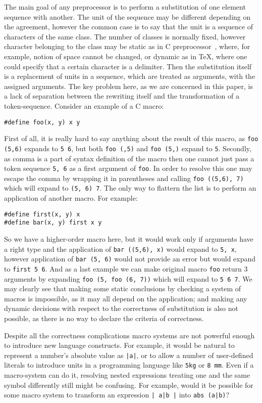 The main goal of any preprocessor is to perform a substitution of
one element sequence with another.  The unit of the sequence may 
be different depending on the agreement, however the common
case is to say that the unit is a sequence of characters of the
same class.  The number of classes is normally fixed, however 
character belonging to the class may be static as in 
C preprocessor~\cite{prepr},
where, for example, notion of space cannot be changed, or dynamic as
in \TeX, where one could specify that a certain character is a 
delimiter.  Then the substitution itself is a replacement of 
units in a sequence, which are treated as arguments, with the 
assigned arguments.  The key problem here, as we are concerned
in this paper, is a lack of separation between the rewriting itself
and the transformation of a token-sequence.  Consider an example of
a C macro:
\begin{verbatim}
#define foo(x, y) x y
\end{verbatim}
First of all, it is really hard to say anything about the result
of this macro, as \verb|foo (5,6)| expands to \verb|5 6|, but
both \verb|foo (,5)| and \verb|foo (5,)| expand to \verb|5|.
Secondly, as comma is a part of syntax definition of the macro
then one cannot just pass a token sequence \verb|5, 6| as a
first argument of \verb|foo|.  In order to resolve this one
may escape the comma by wrapping it in parentheses and calling
\verb|foo ((5,6), 7)| which will expand to \verb|(5, 6) 7|.
The only way to flattern the list is to perform an application
of another macro.  For example:
\begin{verbatim}
#define first(x, y) x
#define bar(x, y) first x y
\end{verbatim}
So we have a higher-order macro here, but it would work only if
arguments have a right type and the application of 
\verb|bar ((5,6), x)| would expand to \verb|5, x|, however
application of \verb|bar (5, 6)| would not provide an error
but would expand to \verb|first 5 6|.  And as a last example
we can make original macro \verb|foo| return 3 arguments
by expanding \verb|foo (5, foo (6, 7))| which will expand to
\verb|5 6 7|.  We may clearly see that making some static 
conclusions by checking a system of macros is impossible, as
it may all depend on the application; and making any dynamic
decisions with respect to the correctness of substitution is
also not possible, as there is no way to declare the criteria
of correctness.

Despite all the correctness complications macro systems are not powerful
enough to introduce new language constructs.  For example, it would be natural
to represent a number's absolute value as \verb/|a|/, or to allow a number of
user-defined literals to introduce units in a programming language like 
\verb/5kg/ or \verb|8 mm|.  Even if a macro-system can do it, resolving nested
expressions treating one and the same symbol differently still might be
confusing.  For example, would it be possible for some macro system to
transform an expression \verb/| a|b |/ into \verb/abs (a|b)/?


